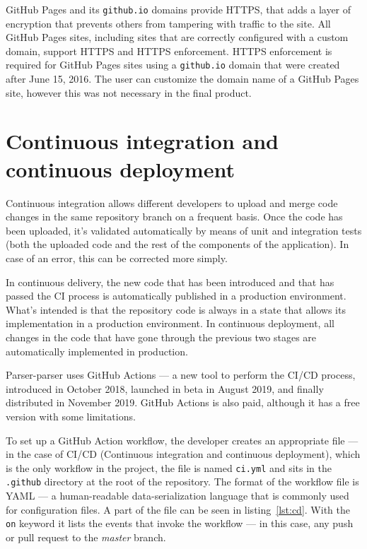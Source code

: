 \documentclass[english,engineering]{wizthesis}
\newcommand{\thisproject}{Parser-parser}
\begin{document}
GitHub Pages and its \texttt{github.io} domains provide HTTPS, that adds a layer
of encryption that prevents others from tampering with traffic to the site. All
GitHub Pages sites, including sites that are correctly configured with a custom
domain, support HTTPS and HTTPS enforcement. HTTPS enforcement is required for
GitHub Pages sites using a \texttt{github.io} domain that were created after
June 15, 2016. The user can customize the domain name of a GitHub Pages site,
however this was not necessary in the final product.

\section{Continuous integration and continuous deployment}

Continuous integration allows different developers to upload and merge code
changes in the same repository branch on a frequent basis. Once the code has
been uploaded, it's validated automatically by means of unit and integration
tests (both the uploaded code and the rest of the components of the
application). In case of an error, this can be corrected more simply.

In continuous delivery, the new code that has been introduced and that has
passed the CI process is automatically published in a production environment.
What's intended is that the repository code is always in a state that allows its
implementation in a production environment. In continuous deployment, all
changes in the code that have gone through the previous two stages are
automatically implemented in production.

\thisproject{} uses GitHub Actions --- a new tool to perform the CI/CD process,
introduced in October 2018, launched in beta in August 2019, and finally
distributed in November 2019. GitHub Actions is also paid, although it has a
free version with some limitations.

To set up a GitHub Action workflow, the developer creates an appropriate file
--- in the case of CI/CD (Continuous integration and continuous deployment),
which is the only workflow in the project, the file is named \texttt{ci.yml} and
sits in the \texttt{.github} directory at the root of the repository. The format
of the workflow file is YAML --- a human-readable data-serialization language
that is commonly used for configuration files. A part of the file can be seen in
listing~\ref{lst:cd}. With the \texttt{on} keyword it lists the events that
invoke the workflow --- in this case, any push or pull request to the
\emph{master} branch.
\end{document}
